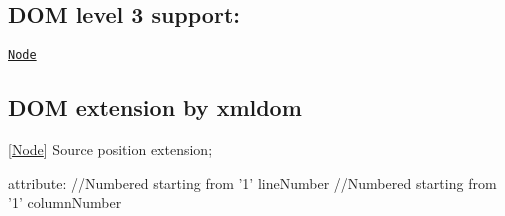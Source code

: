 \subsection*{D\+OM level 3 support\+: }


\begin{DoxyItemize}
\item \href{http://www.w3.org/TR/DOM-Level-3-Core/core.html#Node3-textContent}{\tt Node} \begin{DoxyVerb} attribute:
     textContent
 method:
     isDefaultNamespace(namespaceURI){
     lookupNamespaceURI(prefix)
\end{DoxyVerb}

\end{DoxyItemize}

\subsection*{D\+OM extension by xmldom }


\begin{DoxyItemize}
\item \mbox{[}\mbox{\hyperlink{classNode}{Node}}\mbox{]} Source position extension; \begin{DoxyVerb} attribute:
     //Numbered starting from '1'
     lineNumber
     //Numbered starting from '1'
     columnNumber\end{DoxyVerb}
 
\end{DoxyItemize}
